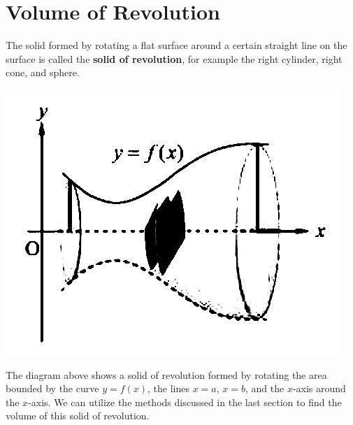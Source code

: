 \newpage




\newpage
\section{Volume of Revolution}
The solid formed by rotating a flat surface around a certain straight line on
the surface is called the \textbf{solid of revolution}, for example the right
cylinder, right cone, and sphere.

\begin{center}
    \includegraphics[scale=0.3]{assets/28-22a.png}
\end{center}
The diagram above shows a solid of revolution formed by rotating the area
bounded by the curve $y = f(x)$, the lines $x = a$, $x = b$, and the $x$-axis
around the $x$-axis. We can utilize the methods discussed in the last section
to find the volume of this solid of revolution.

